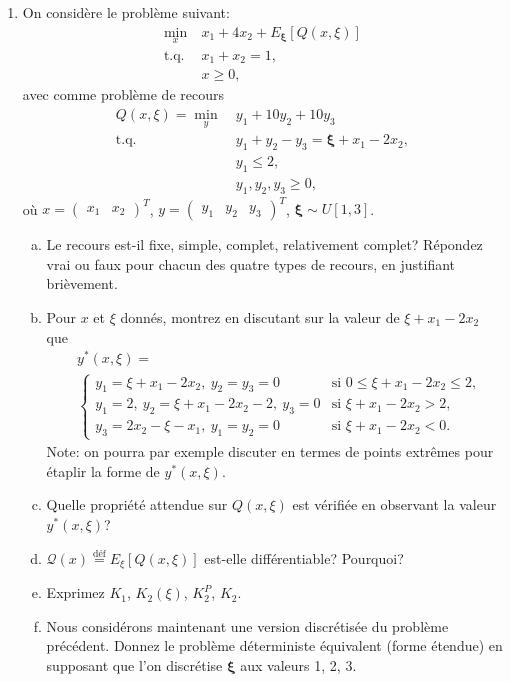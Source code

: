 \documentclass[12pt]{book}
\def\bxi {\boldsymbol{\xi}}
\begin{document}
\begin{enumerate}
\item
On considère le problème suivant:
\begin{align*}
\min_x \ & x_1 + 4 x_2 + E_{\bxi}[Q(x,\xi)] \\
\mbox{t.q. } & x_1 + x_2 = 1,\\
& x \geq 0,
\end{align*}
avec comme problème de recours
\begin{align*}
Q(x,\xi) = \min_y \ & y_1 + 10 y_2 + 10 y_3 \\
\mbox{t.q. } & y_1 + y_2 - y_3 = \bxi + x_1 - 2 x_2,\\
& y_1 \leq 2,\\
&  y_1, y_2, y_3 \geq 0,
\end{align*}
où $x = \begin{pmatrix} x_1 & x_2 \end{pmatrix}^T$, $y
= \begin{pmatrix} y_1 & y_2 & y_3 \end{pmatrix}^T$, $\bxi \sim U[1,3]$.
\begin{enumerate}[(a)]
	\item
	Le recours est-il fixe, simple, complet, relativement complet? Répondez vrai ou faux pour chacun des quatre types de recours, en justifiant brièvement.
	\item
	Pour $x$ et $\xi$ donnés, montrez en discutant sur la valeur de $\xi + x_1 - 2 x_2$ que
	\begin{align*}
	& y^*(x, \xi) = \\
	& \begin{cases}
	y_1 = \xi + x_1 - 2x_2,\ y_2 = y_3 = 0 & \mbox{si } 0 \leq \xi + x_1 -2 x_2
	\leq 2,\\
	y_1 = 2,\ y_2 = \xi + x_1 - 2 x_2 - 2,\ y_3 = 0 & \mbox{si } \xi + x_1 -2 x_2 >
	2,\\
	y_3 = 2x_2 - \xi -x_1,\ y_1 = y_2 = 0 & \mbox{si } \xi + x_1 - 2x_2 < 0.
	\end{cases}
	\end{align*}
	Note: on pourra par exemple discuter en termes de points extrêmes pour étaplir la forme de $y^*(x, \xi)$.
	\item
	Quelle propriété attendue sur $Q(x,\xi)$ est vérifiée en observant la
	valeur $y^*(x,\xi)$?
	\item
	$\mathcal{Q}(x) \overset{\mbox{déf}}{=} E_\xi[Q(x, \xi)]$ est-elle différentiable?
	Pourquoi?
	\item
	Exprimez $K_1$, $K_2(\xi)$, $K_2^P$, $K_2$.
	\item
	Nous considérons maintenant une version discrétisée du problème précédent. Donnez le problème déterministe équivalent (forme étendue) en supposant que l'on discrétise $\bxi$ aux valeurs 1, 2, 3.
\end{enumerate}


\end{enumerate}
\end{document}
